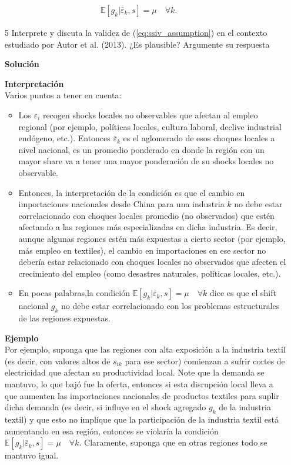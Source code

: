 \documentclass[a4paper, answers, addpoints, 11pt]{exam}
\newenvironment{solucion}{%
  \begin{mdframed}[
    backgroundcolor=blue!5,    %
    linecolor=blue!50,          %
    linewidth=2pt,              %
    leftmargin=10pt,            %
    rightmargin=8pt,           %
    topline=true,              %
    bottomline=true,            %
    roundcorner=10pt,           %
    innerleftmargin=10pt,       %
    innerrightmargin=10pt,      %
    innerbottommargin=10pt,     %
    innertopmargin=10pt         %
  ]%
  \begin{tcolorbox}[colframe=blue!50!black, colback=blue!50, coltitle=white, sharp corners=all, boxrule=1mm, width=\textwidth, halign=left, valign=center, top=0mm, bottom=0mm, left=0mm, right=0mm] \textbf{Solución} \end{tcolorbox} }{\end{mdframed}}
\begin{document}
\begin{align}
     \mathbb{E}[g_k | \bar{\varepsilon}_k, s] = \mu \quad \forall k.
     \label{eq:ssiv_assumption}
\end{align}

\begin{enumerate}
    \item[5] Interprete y discuta la validez de (\ref{eq:ssiv_assumption}) en el contexto estudiado por Autor et al. (2013). ¿Es plausible? Argumente su respuesta
    \begin{solucion}
    \textbf{Interpretación} \\
        Varios puntos a tener en cuenta:
     \begin{itemize}
     \item  Los $\varepsilon_i$  recogen shocks locales no observables que afectan al empleo regional (por ejemplo, políticas locales, cultura laboral, declive industrial endógeno, etc.). Entonces $\bar{\varepsilon}_k$ es el aglomerado de esos choques locales a nivel nacional,  es un promedio ponderado en donde la región con un mayor share va a tener una mayor ponderación de su shocks locales no observable.
    \item  Entonces, la interpretación de la condición es que el cambio en importaciones nacionales desde China para una industria $k$ no debe estar correlacionado con choques locales promedio (no observados) que estén afectando a las regiones más especializadas en dicha industria.  Es decir,   aunque algunas regiones estén más expuestas a cierto sector (por ejemplo, más empleo en textiles), el cambio en importaciones en ese sector no debería estar relacionado con choques locales no observados que afecten el crecimiento del empleo (como desastres naturales, políticas locales, etc.). 
    
    \item  En pocas palabras,la condición $ \mathbb{E}[g_k | \bar{\varepsilon}_k, s] = \mu \quad \forall k$ dice es que el shift nacional $g_k$  no debe estar correlacionado con los problemas estructurales de las regiones expuestas. 

     \end{itemize} 
     
   \textbf{Ejemplo}\\
    Por ejemplo, suponga que las regiones con alta exposición a la industria textil (es decir, con valores altos de $s_{ik}$
  para ese sector) comienzan a sufrir cortes de electricidad que afectan su productividad local. Note que la demanda se mantuvo, lo que bajó fue la oferta, entonces si esta disrupción local lleva a que aumenten las importaciones nacionales de productos textiles para suplir dicha demanda (es decir, si influye en el shock agregado $g_k$
de la industria textil) y que esto no implique que la participación de la industria textil está aumentando en esa región, entonces se violaría la condición $ \mathbb{E}[g_k | \bar{\varepsilon}_k, s] = \mu \quad \forall k.$ Claramente, suponga que en otras regiones todo se mantuvo igual.


\end{solucion}
\end{enumerate}
\end{document}
